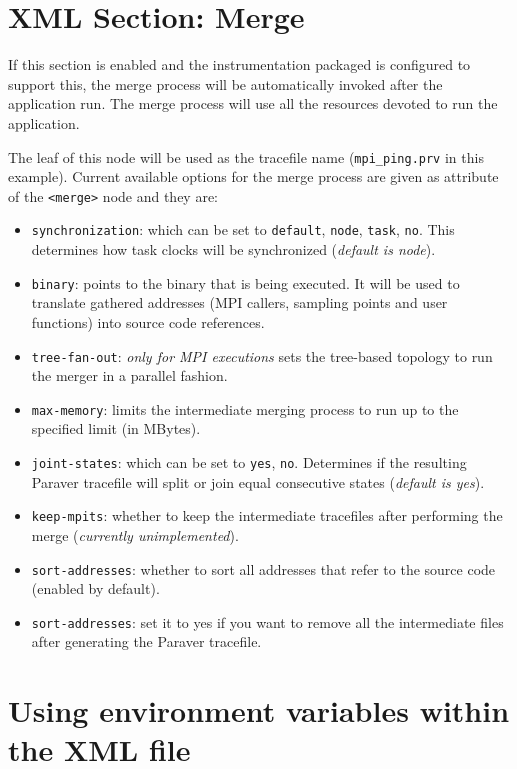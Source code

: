 \section{XML Section: Merge}\label{sec:XMLSectionMerge}



If this section is enabled and the instrumentation packaged is configured to support this, the merge process will be automatically invoked after the application run. The merge process will use all the resources devoted to run the application.

The leaf of this node will be used as the tracefile name ({\tt mpi\_ping.prv} in this example). Current available options for the merge process are given as attribute of the {\tt <merge>} node and they are:

\begin{itemize}
 \item {\tt synchronization}: which can be set to {\tt default}, {\tt node}, {\tt task}, {\tt no}. This determines how task clocks will be synchronized ({\em default is node}).
 \item {\tt binary}: points to the binary that is being executed. It will be used to translate gathered addresses (MPI callers, sampling points and user functions) into source code references.
 \item {\tt tree-fan-out}: {\em only for MPI executions} sets the tree-based topology to run the merger in a parallel fashion.
 \item {\tt max-memory}: limits the intermediate merging process to run up to the specified limit (in MBytes).
 \item {\tt joint-states}: which can be set to {\tt yes}, {\tt no}. Determines if the resulting Paraver tracefile will split or join equal consecutive states ({\em default is yes}).
 \item {\tt keep-mpits}: whether to keep the intermediate tracefiles after performing the merge ({\em currently unimplemented}).
 \item {\tt sort-addresses}: whether to sort all addresses that refer to the source code (enabled by default).
 \item {\tt sort-addresses}: set it to yes if you want to remove all the intermediate files after generating the Paraver tracefile.
\end{itemize}


\section{Using environment variables within the XML file}\label{sec:EnvVars_in_XML}

